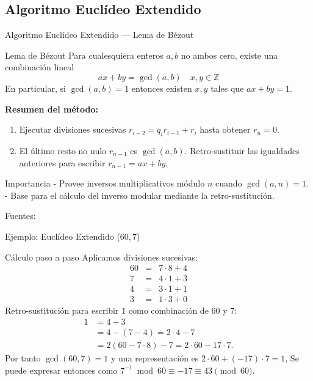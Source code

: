 \documentclass[aspectratio=169]{beamer}
\begin{document}
\subsection{Algoritmo Euclídeo Extendido}
\begin{frame}{Algoritmo Euclídeo Extendido — Lema de Bézout}
    \begin{block}{Lema de Bézout}
      Para cualesquiera enteros $a,b$ no ambos cero, existe una combinación lineal
      $$ax+by = \gcd(a,b) \quad x,y\in\mathbb{Z}$$
      En particular, si $\gcd(a,b)=1$ entonces existen $x,y$ tales que $ax+by=1$.
    \end{block}
    \textbf{Resumen del método:}
    \begin{enumerate}
      \item Ejecutar divisiones sucesivas $r_{i-2}=q_i r_{i-1}+r_i$ hasta obtener $r_n=0$.
      \item El último resto no nulo $r_{n-1}$ es $\gcd(a,b)$. Retro-sustituir las igualdades anteriores para escribir $r_{n-1}=ax+by$.
    \end{enumerate}
 

    \begin{block}{Importancia}
      - Provee inversos multiplicativos módulo $n$ cuando $\gcd(a,n)=1$.\\
      - Base para el cálculo del inverso modular mediante la retro-sustitución.
    \end{block}
    \scriptsize Fuentes: \cite{freecodecamp-euclid,brilliant-euclid,cpalg-euclid}
    
\end{frame}

\begin{frame}{Ejemplo: Euclídeo Extendido (60,\,7)}
\begin{exampleblock}{Cálculo paso a paso}
Aplicamos divisiones sucesivas:
\[
  \begin{array}{rcl}
    60 &=& 7\cdot 8 + 4\\
    7  &=& 4\cdot 1 + 3\\
    4  &=& 3\cdot 1 + 1\\
    3  &=& 1\cdot 3 + 0
  \end{array}
\]
Retro-sustitución para escribir $1$ como combinación de $60$ y $7$:
\[
  \begin{aligned}
    1 &= 4-3\\
      &= 4-(7-4) = 2\cdot4 - 7\\
      &= 2(60-7\cdot8)-7 = 2\cdot60 -17\cdot7.
  \end{aligned}
\]
Por tanto $\gcd(60,7)=1$ y una representación es $2\cdot60 + (-17)\cdot7 = 1$,
Se puede expresar entonces como  $7^{-1}\bmod 60 \equiv -17 \equiv 43 \pmod {60}$.
\end{exampleblock}
\vspace{6pt}

\end{frame}
\end{document}
